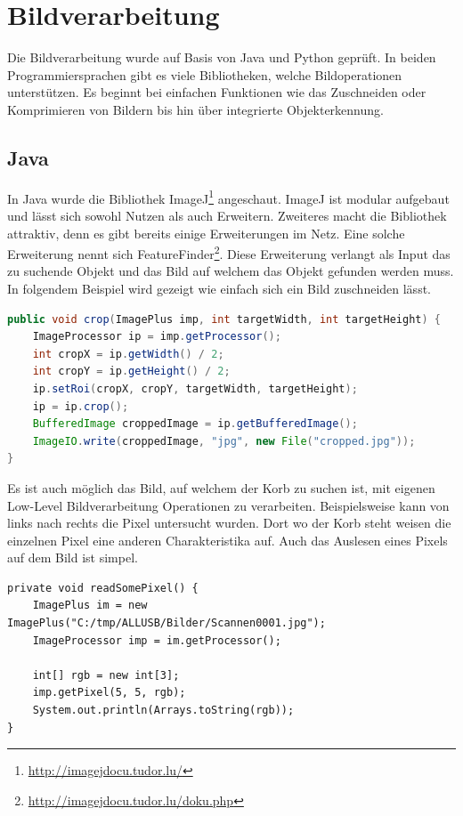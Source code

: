 \section{Bildverarbeitung}
\label{anhang-bildverarbeitung}
Die Bildverarbeitung wurde auf Basis von Java und Python geprüft. In beiden Programmiersprachen gibt es viele Bibliotheken, welche Bildoperationen unterstützen. Es beginnt bei einfachen Funktionen wie das Zuschneiden oder Komprimieren von Bildern bis hin über integrierte Objekterkennung.

\subsection{Java}
In Java wurde die Bibliothek ImageJ\footnote{\href{http://imagejdocu.tudor.lu/}{http://imagejdocu.tudor.lu/}} angeschaut. ImageJ ist modular aufgebaut und lässt sich sowohl Nutzen als auch Erweitern. Zweiteres macht die Bibliothek attraktiv, denn es gibt bereits einige Erweiterungen im Netz. Eine solche Erweiterung nennt sich FeatureFinder\footnote{\href{http://imagejdocu.tudor.lu/doku.php?id=plugin:analysis:feature_finder:start}{http://imagejdocu.tudor.lu/doku.php}}. Diese Erweiterung verlangt als Input das zu suchende Objekt und das Bild auf welchem das Objekt gefunden werden muss. In folgendem Beispiel wird gezeigt wie einfach sich ein Bild zuschneiden lässt.

\begin{lstlisting}[caption={Bild zuschneiden mit ImageJ}, language=Java]
public void crop(ImagePlus imp, int targetWidth, int targetHeight) {
	ImageProcessor ip = imp.getProcessor();
	int cropX = ip.getWidth() / 2;
	int cropY = ip.getHeight() / 2;
	ip.setRoi(cropX, cropY, targetWidth, targetHeight);
	ip = ip.crop();
	BufferedImage croppedImage = ip.getBufferedImage();
	ImageIO.write(croppedImage, "jpg", new File("cropped.jpg"));
}
\end{lstlisting}

Es ist auch möglich das Bild, auf welchem der Korb zu suchen ist, mit eigenen Low-Level Bildverarbeitung Operationen zu verarbeiten. Beispielsweise kann von links nach rechts die Pixel untersucht wurden. Dort wo der Korb steht weisen die einzelnen Pixel eine anderen Charakteristika auf. Auch das Auslesen eines Pixels auf dem Bild ist simpel.

\begin{lstlisting}[caption={Auslesen eines Pixels mit ImageJ}]
private void readSomePixel() {
	ImagePlus im = new ImagePlus("C:/tmp/ALLUSB/Bilder/Scannen0001.jpg");
	ImageProcessor imp = im.getProcessor();

	int[] rgb = new int[3];
	imp.getPixel(5, 5, rgb);
	System.out.println(Arrays.toString(rgb));
}
\end{lstlisting}

